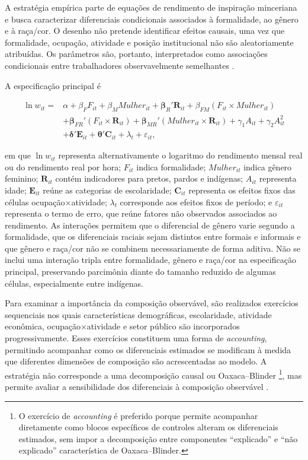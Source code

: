 \documentclass[12pt]{article}
\begin{document}
A estratégia empírica parte de equações de rendimento de inspiração minceriana
\citep{mincer1974schooling} e busca caracterizar diferenciais condicionais
associados à formalidade, ao gênero e à raça/cor. O desenho não pretende
identificar efeitos causais, uma vez que formalidade, ocupação, atividade e
posição institucional não são aleatoriamente atribuídas. Os parâmetros são,
portanto, interpretados como associações condicionais entre trabalhadores
observavelmente semelhantes \citep{wooldridge2010econometric}.

A especificação principal é

\begin{align}
\ln w_{it}
={}&
\alpha
+\beta_F F_{it}
+\beta_M Mulher_{it}
+\boldsymbol{\beta}_{R}'\mathbf{R}_{it}
+\beta_{FM}(F_{it}\times Mulher_{it})
\nonumber\\
&+
\boldsymbol{\beta}_{FR}'(F_{it}\times\mathbf{R}_{it})
+
\boldsymbol{\beta}_{MR}'(Mulher_{it}\times\mathbf{R}_{it})
+\gamma_1 A_{it}
+\gamma_2 A_{it}^{2}
\nonumber\\
&+
\boldsymbol{\delta}'\mathbf{E}_{it}
+
\boldsymbol{\theta}'\mathbf{C}_{it}
+\lambda_t
+\varepsilon_{it},
\label{eq:modelo_principal}
\end{align}

\noindent
em que $\ln w_{it}$ representa alternativamente o logaritmo do rendimento
mensal real ou do rendimento real por hora; $F_{it}$ indica formalidade; $Mulher_{it}$ indica gênero feminino;
$\mathbf{R}_{it}$ contém indicadores para pretos, pardos e indígenas;
$A_{it}$ representa idade; $\mathbf{E}_{it}$ reúne as categorias de
escolaridade; $\mathbf{C}_{it}$ representa os efeitos fixos das células
ocupação$\times$atividade; $\lambda_t$ corresponde aos efeitos fixos de
período; e $\varepsilon_{it}$ representa o termo de erro, que reúne fatores não observados associados ao rendimento. 
As interações permitem que o diferencial de gênero varie segundo a
formalidade, que os diferenciais raciais sejam distintos entre formais e
informais e que gênero e raça/cor não se combinem necessariamente de forma
aditiva. Não se inclui uma interação tripla entre formalidade, gênero e raça/cor
na especificação principal, preservando parcimônia diante do tamanho reduzido
de algumas células, especialmente entre indígenas.

Para examinar a importância da composição observável, 
são realizados exercícios sequenciais nos quais características demográficas, 
escolaridade, atividade econômica, ocupação$\times$atividade e setor público são
incorporados progressivamente. Esses exercícios constituem uma forma de 
\textit{accounting}, permitindo acompanhar como os diferenciais estimados 
se modificam à medida que diferentes dimensões de composição são acrescentadas 
ao modelo. A estratégia não corresponde a uma decomposição causal ou Oaxaca–Blinder
\footnote{O exercício de \textit{accounting} é preferido porque permite acompanhar diretamente 
como blocos específicos de controles alteram os diferenciais estimados, sem impor a 
decomposição entre componentes ``explicado'' e ``não explicado'' característica de 
Oaxaca--Blinder.}, mas permite avaliar a sensibilidade dos diferenciais à composição 
observável \citep{wooldridge2010econometric}.
\end{document}
